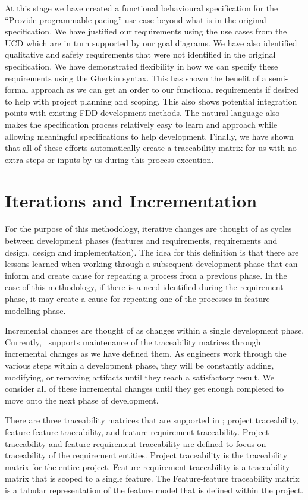 At this stage we have created a functional behavioural specification for the ``Provide programmable pacing'' use case beyond what is in the original specification. We have justified our requirements using the use cases from the \ac{UCD} which are in turn supported by our goal diagrams. We have also identified qualitative and safety requirements that were not identified in the original specification. We have demonstrated flexibility in how we can specify these requirements using the Gherkin syntax. This has shown the benefit of a semi-formal approach as we can get an order to our functional requirements if desired to help with project planning and scoping. This also shows potential integration points with existing \ac{FDD} development methods. The natural language also makes the specification process relatively easy to learn and approach while allowing meaningful specifications to help development. Finally, we have shown that all of these efforts automatically create a traceability matrix for us with no extra steps or inputs by us during this process execution.

\section{Iterations and Incrementation}

For the purpose of this methodology, iterative changes are thought of as cycles between development phases (features and requirements, requirements and design, design and implementation). The idea for this definition is that there are lessons learned when working through a subsequent development phase that can inform and create cause for repeating a process from a previous phase. In the case of this methodology, if there is a need identified during the requirement phase, it may create a cause for repeating one of the processes in feature modelling phase. 

Incremental changes are thought of as changes within a single development phase. Currently, \tool\ supports maintenance of the traceability matrices through incremental changes as we have defined them. As engineers work through the various steps within a development phase, they will be constantly adding, modifying, or removing artifacts until they reach a satisfactory result. We consider all of these incremental changes until they get enough completed to move onto the next phase of development.

There are three traceability matrices that are supported in \tool; project traceability, feature-feature traceability, and feature-requirement traceability. Project traceability and feature-requirement traceability are defined to focus on traceability of the requirement entities. Project traceability is the traceability matrix for the entire project. Feature-requirement traceability is a traceability matrix that is scoped to a single feature. The Feature-feature traceability matrix is a tabular representation of the feature model that is defined within the project.

